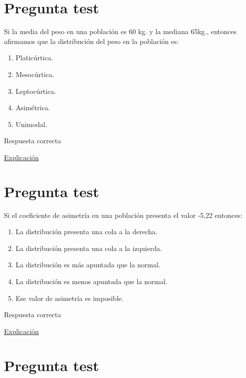 \documentclass[
]{book}
\providecommand{\tightlist}{%
  \setlength{\itemsep}{0pt}\setlength{\parskip}{0pt}}
\begin{document}
\hypertarget{pregunta-test-67}{%
\section{Pregunta test}\label{pregunta-test-67}}

Si la media del peso en una población es 60 kg. y la mediana 65kg., entonces afirmamos que la distribución del peso en la población es:

\begin{enumerate}
\def\labelenumi{\alph{enumi})}
\tightlist
\item
  Platicúrtica.
\item
  Mesocúrtica.
\item
  Leptocúrtica.
\item
  Asimétrica.
\item
  Unimodal.
\end{enumerate}

Respuesta correcta

\href{https://1fjmanzano.github.io/bioestadistica/medidas-de-forma.html}{Explicación}

\hypertarget{pregunta-test-68}{%
\section{Pregunta test}\label{pregunta-test-68}}

Si el coeficiente de asimetría en una población presenta el valor -5,22 entonces:

\begin{enumerate}
\def\labelenumi{\alph{enumi})}
\tightlist
\item
  La distribución presenta una cola a la derecha.
\item
  La distribución presenta una cola a la izquierda.
\item
  La distribución es más apuntada que la normal.
\item
  La distribución es menos apuntada que la normal.
\item
  Ese valor de asimetría es imposible.
\end{enumerate}

Respuesta correcta

\href{https://1fjmanzano.github.io/bioestadistica/medidas-de-forma.html}{Explicación}

\hypertarget{pregunta-test-69}{%
\section{Pregunta test}\label{pregunta-test-69}}
\end{document}

